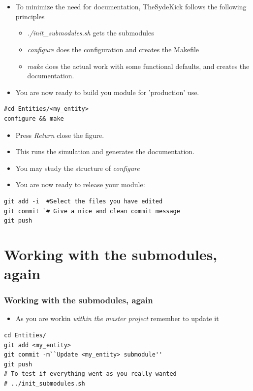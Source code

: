 \documentclass{sdkslides}
\begin{document}
\section*{\sectionname}
\begin{frame}[t,fragile]
    \frametitle{\sectionname}
    \begin{itemize}
        \item To minimize the need for documentation, TheSydeKick follows the
            following principles
            \begin{itemize}
                \item \emph{./init\_submodules.sh} gets the submodules
                \item \emph{configure} does the configuration and creates the
                    Makefile
                \item \emph{make} does the actual work with some functional
                    defaults, and creates the documentation.
            \end{itemize}
        \item You are now ready to build you module for 'production' use.
    \end{itemize}
\begin{lstlisting}
#cd Entities/<my_entity>
configure && make
\end{lstlisting}
    \begin{itemize}
        \item Press \emph{Return} close the figure.
        \item This runs the simulation and generates the documentation. 
        \item You may study the structure of \emph{configure}
        \item You are now ready to release your module:
    \end{itemize}
\begin{lstlisting}
git add -i  #Select the files you have edited
git commit `# Give a nice and clean commit message
git push    
\end{lstlisting}
\end{frame}

\renewcommand{\sectionname}{Working with the submodules, again}
\section*{\sectionname}
\begin{frame}[t,fragile]
    \frametitle{\sectionname} 
    \begin{itemize}
        \item As you are workin \emph{within the master project}
                remember to update it
    \end{itemize}
\begin{lstlisting}
cd Entities/
git add <my_entity>
git commit -m``Update <my_entity> submodule''
git push
# To test if everything went as you really wanted
# ../init_submodules.sh
\end{lstlisting}
\end{frame}
\end{document}
